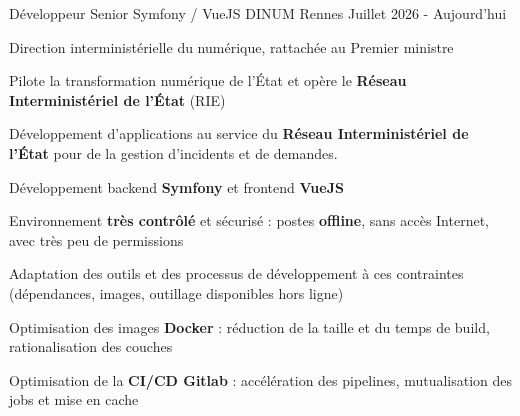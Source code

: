 

\begin{cventries}

	\begin{cvexperience}
		\cvbigentry
		{Développeur Senior Symfony / VueJS} %
		{ DINUM} %
		{Rennes} %
		{Juillet 2026 - Aujourd'hui} %
		{
			\vspace{2mm}
			\begin{cvitems} %
				\item {Direction interministérielle du numérique, rattachée au Premier ministre}
				\item {Pilote la transformation numérique de l'État et opère le \textbf{Réseau Interministériel de l'État} (RIE)}
			\end{cvitems}
		}

		\begin{cvitems}
			\item {Développement d'applications au service du \textbf{Réseau Interministériel de l'État} pour de la gestion d'incidents et de demandes.}
			\item {Développement backend \textbf{Symfony} et frontend \textbf{VueJS}}
			\item {Environnement \textbf{très contrôlé} et sécurisé : postes \textbf{offline}, sans accès Internet, avec très peu de permissions}
			\item {Adaptation des outils et des processus de développement à ces contraintes (dépendances, images, outillage disponibles hors ligne)}
			\item {Optimisation des images \textbf{Docker} : réduction de la taille et du temps de build, rationalisation des couches}
			\item {Optimisation de la \textbf{CI/CD Gitlab} : accélération des pipelines, mutualisation des jobs et mise en cache}
		\end{cvitems}


\end{cvexperience}
\end{cventries}
